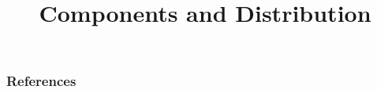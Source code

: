 \documentclass{beamer}
\title[Distributional]{Components and Distribution}
\begin{document}
\maketitle








\begin{frame}[allowframebreaks]
  \frametitle{References}
  
  
\end{frame}
\end{document}
